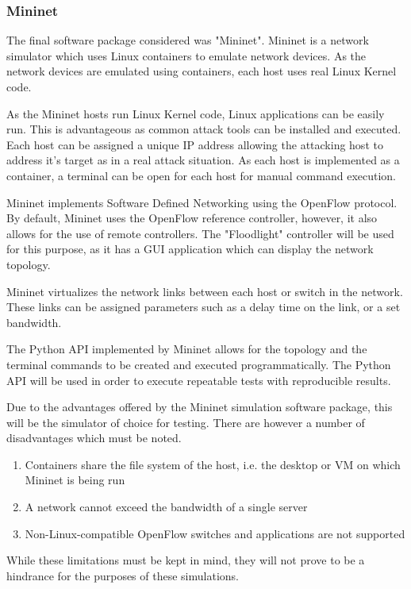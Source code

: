 \subsubsection{Mininet}

The final software package considered was "Mininet". Mininet is a network
simulator which uses Linux containers to emulate network devices\cite{}. As the
network devices are emulated using containers, each host uses real Linux Kernel
code.

As the Mininet hosts run Linux Kernel code, Linux applications can be easily
run. This is advantageous as common attack tools can be installed and executed.
Each host can be assigned a unique IP address allowing the attacking host to
address it's target as in a real attack situation. As each host is implemented
as a container, a terminal can be open for each host for manual command execution.

Mininet implements Software Defined Networking using the OpenFlow protocol. By
default, Mininet uses the OpenFlow reference controller, however, it also allows
for the use of remote controllers. The "Floodlight" controller will be used for
this purpose, as it has a GUI application which can display the network
topology.

Mininet virtualizes the network links between each host or switch in the
network. These links can be assigned parameters such as a delay time on the
link, or a set bandwidth.

The Python API implemented by Mininet allows for the topology and the terminal
commands to be created and executed programmatically. The Python API will be
used in order to execute repeatable tests with reproducible results.

Due to the advantages offered by the Mininet simulation software package, this
will be the simulator of choice for testing. There are however a number of
disadvantages which must be noted.

\begin{enumerate}
	\item Containers share the file system of the host, i.e. the desktop or
		VM on which Mininet is being run
	\item A network cannot exceed the bandwidth of a single server
	\item Non-Linux-compatible OpenFlow switches and applications are not
		supported
\end{enumerate}

While these limitations must be kept in mind, they will not prove to be a
hindrance for the purposes of these simulations.
